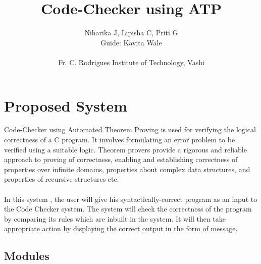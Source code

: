 \documentclass[]{article}
\begin{document}
	\title{\huge\textbf{Code-Checker using ATP}}
	\author{Niharika J, Lipisha C, Priti G  \\Guide: Kavita Wale \\ \\ \LARGE Fr. C. Rodrigues Institute of Technology, Vashi}
	\maketitle
	\pagebreak

\section{Proposed System}\label{proposed-system}

Code-Checker using Automated Theorem Proving is used for verifying the
logical correctness of a C program. It involves formulating an error
problem to be verified using a suitable logic. Theorem provers provide a
rigorous and reliable approach to proving of correctness, enabling and
establishing correctness of properties over infinite domains, properties
about complex data structures, and properties of recursive
structures etc. \\ \\
In this system , the user will give his syntactically-correct program as
an input to the Code Checker system. The system will check the
correctness of the program by comparing its rules which are inbuilt in
the system. It will then take appropriate action by displaying the
correct output in the form of message.

\subsection{Modules}\label{modules}
\end{document}
